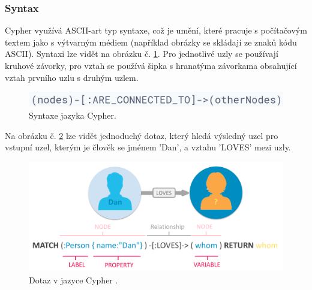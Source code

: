 \subsubsection{Syntax}
Cypher využívá \gls{ASCII}-art typ syntaxe, což je umění, které pracuje s počítačovým textem jako s výtvarným médiem (například obrázky se skládají ze znaků kódu \gls{ASCII}). Syntaxi lze vidět na obrázku č. \ref{fig:cypher_syntax}. Pro jednotlivé uzly se používají kruhové závorky, pro vztah se používá šipka s hranatýma závorkama obsahující vztah prvního uzlu s druhým uzlem.
	\begin{figure}[H]
	\centering
	\includegraphics[width=14cm]{img/databaze/cypher_syntax1}
	\caption{Syntaxe jazyka Cypher.}
	\label{fig:cypher_syntax}
	\end{figure}
\noindent Na obrázku č. \ref{fig:cypher_sample} lze vidět jednoduchý dotaz, který hledá výsledný uzel pro vstupní uzel, kterým je člověk se jménem 'Dan', a vztahu 'LOVES' mezi uzly.
	\begin{figure}[H]
	\centering
	\includegraphics[width=14cm]{img/databaze/sample-cypher}
	\caption{Dotaz v jazyce Cypher \cite{cypher}.}
	\label{fig:cypher_sample}
	\end{figure}
